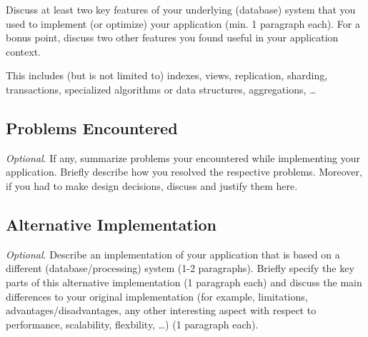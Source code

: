 Discuss at least two key features of your underlying (database) system that you
used to implement (or optimize) your application (min. 1 paragraph each). For
a bonus point, discuss two other features you found useful in your application
context.

This includes (but is not limited to) indexes, views, replication, sharding,
transactions, specialized algorithms or data structures, aggregations, \ldots

\subsection{Problems Encountered}

\emph{Optional}. If any, summarize problems your encountered while implementing
your application. Briefly describe how you resolved the respective problems.
Moreover, if you had to make design decisions, discuss and justify them here.

\subsection{Alternative Implementation}

\emph{Optional}. Describe an implementation of your application that is based on
a different (database/processing) system (1-2 paragraphs). Briefly specify the
key parts of this alternative implementation (1 paragraph each) and discuss the
main differences to your original implementation (for example, limitations,
advantages/disadvantages, any other interesting aspect with respect to
performance, scalability, flexbility, \ldots) (1 paragraph each).
